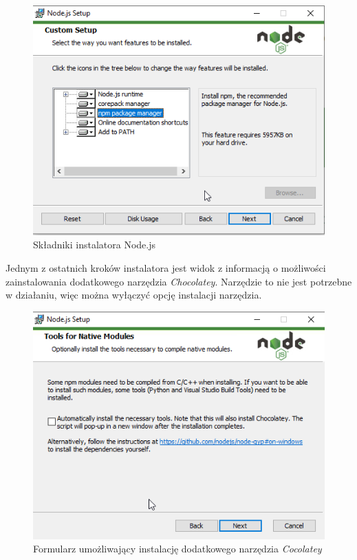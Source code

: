 \documentclass[a4paper,twoside,12pt]{book}
\begin{document}
\begin{figure}[H]
	\centering
	\includegraphics[width=0.7\linewidth]{../zrzuty_ekranu/instalacja_nodejs/node4}
	\caption{Składniki instalatora Node.js}
	\label{fig:node4}
\end{figure}

Jednym z ostatnich kroków instalatora jest widok z informacją o możliwości zainstalowania dodatkowego narzędzia \textit{Chocolatey}. Narzędzie to nie jest potrzebne w działaniu, więc można wyłączyć opcję instalacji narzędzia.

\begin{figure}[H]
	\centering
	\includegraphics[width=0.7\linewidth]{../zrzuty_ekranu/instalacja_nodejs/node5}
	\caption{Formularz umożliwający instalację dodatkowego narzędzia \textit{Cocolatey}}
	\label{fig:node5}
\end{figure}
\end{document}
